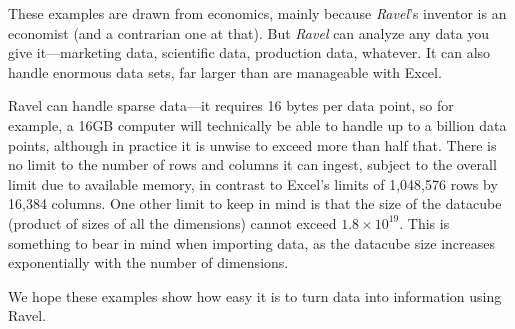 These examples are drawn from economics, mainly because \emph{Ravel}'s
inventor is an economist (and a contrarian one at that). But \emph{Ravel}
can analyze any data you give it---marketing data, scientific data,
production data, whatever. It can also handle enormous data sets,
far larger than are manageable with Excel.
 
Ravel can handle sparse data---it requires 16 bytes per data point, so
for example, a 16GB computer will technically be able to handle up to a billion
data points, although in practice it is unwise to exceed more than
half that. There is no limit to the number of rows and columns it can
ingest, subject to the overall limit due to available memory, in
contrast to Excel's limits of 1,048,576 rows by 16,384 columns. One
other limit to keep in mind is that the size of the datacube (product
of sizes of all the dimensions) cannot exceed $1.8\times
10^{19}$. This is something to bear in mind when importing data, as
the datacube size increases exponentially with the number of
dimensions.

We hope these examples show how easy it is to turn data into information
using Ravel.

